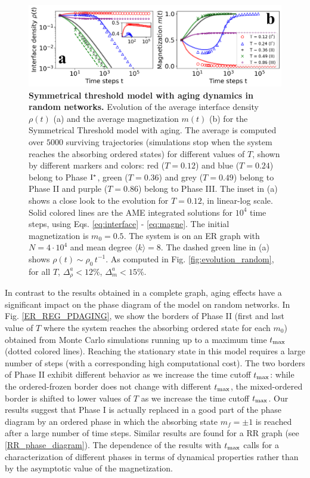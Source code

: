 	\begin{figure}[b]
		 \centering
		 \includegraphics[width=\textwidth]{Figs/Aging_STM/FIG6.pdf}
		 \caption{\label{fig:evolution_random_aging} \textbf{Symmetrical threshold model with aging dynamics in random networks.} Evolution of the average interface density $\rho(t)$ (a) and the average magnetization $m(t)$ (b) for the Symmetrical Threshold model with aging. The average is computed over $5000$ surviving trajectories (simulations stop when the system reaches the absorbing ordered states) for different values of $T$, shown by different markers and colors: red ($T = 0.12$) and blue ($T = 0.24$) belong to Phase ${\rm I}^{*}$, green ($T = 0.36$) and grey ($T = 0.49$) belong to Phase II and purple ($T = 0.86$) belong to Phase III. The inset in (a) shows a close look to the evolution for $T = 0.12$, in linear-log scale. Solid colored lines are the AME integrated solutions for $10^4$ time steps, using Eqs. \ref{eq:interface} - \ref{eq:magne}. The initial magnetization is $m_0 = 0.5$. The system is on an ER graph with $N = 4 \cdot 10^4$ and mean degree $\langle k \rangle = 8$. The dashed green line in (a) shows $\rho(t) \sim \rho_0 \, t^{-1}$.
		 As computed in Fig. \ref{fig:evolution_random}, for all $T$, $\Delta^{a}_{\rho} < 12\%$, $\Delta^{a}_{m} < 15\%$.}
	\end{figure}
	
	In contrast to the results obtained in a complete graph, aging effects have a significant impact on the phase diagram of the model on random networks. In Fig. \ref{ER_REG_PDAGING}, we show the borders of Phase II (first and last value of $T$ where the system reaches the absorbing ordered state for each $m_0$) obtained from Monte Carlo simulations running up to a maximum time $t_{\rm max}$ (dotted colored lines). Reaching the stationary state in this model requires a large number of steps (with a corresponding high computational cost). The two borders of Phase II exhibit different behavior as we increase the time cutoff $t_{\rm max}$: while the ordered-frozen border does not change with different $t_{\rm max}$, the mixed-ordered border is shifted to lower values of $T$ as we increase the time cutoff $t_{\rm max}$. Our results suggest that Phase I is actually replaced in a good part of the phase diagram by an ordered phase in which the absorbing state $m_f = \pm 1$ is reached after a large number of time steps. Similar results are found for a RR graph (see \ref{RR_phase_diagram}). The dependence of the results with $t_{\rm max}$ calls for a characterization of different phases in terms of dynamical properties rather than by the asymptotic value of the magnetization.
	
